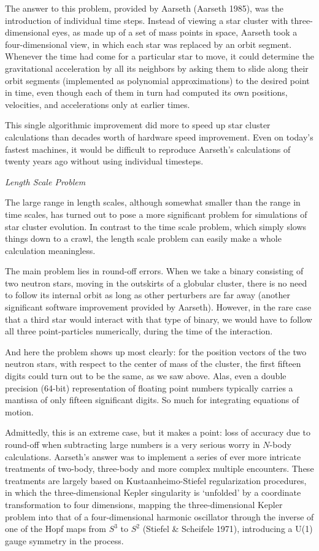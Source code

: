The answer to this problem, provided by Aarseth (\cf Aarseth 1985),
was the introduction of individual time steps.  Instead of viewing a
star cluster with three-dimensional eyes, as made up of a set of mass
points in space, Aarseth took a four-dimensional view, in which each
star was replaced by an orbit segment.  Whenever the time had come for
a particular star to move, it could determine the gravitational
acceleration by all its neighbors by asking them to slide along their
orbit segments (implemented as polynomial approximations) to the
desired point in time, even though each of them in turn had computed
its own positions, velocities, and accelerations only at earlier times.

This single algorithmic improvement did more to speed up star cluster
calculations than decades worth of hardware speed improvement.  Even
on today's fastest machines, it would be difficult to reproduce
Aarseth's calculations of twenty years ago without using individual
timesteps.

\bigskip
\noindent
{\it Length Scale Problem}
\medskip

The large range in length scales, although somewhat smaller than the
range in time scales, has turned out to pose a more significant
problem for simulations of star cluster evolution.  In contrast to the
time scale problem, which simply slows things down to a crawl, the
length scale problem can easily make a whole calculation meaningless.

The main problem lies in round-off errors.  When we take a binary
consisting of two neutron stars, moving in the outskirts of a globular
cluster, there is no need to follow its internal orbit as long as
other perturbers are far away (another significant software
improvement provided by Aarseth).  However, in the rare case that a
third star would interact with that type of binary, we would have to
follow all three point-particles numerically, during the time of the
interaction.

And here the problem shows up most clearly: for the position vectors
of the two neutron stars, with respect to the center of mass of the
cluster, the first fifteen digits could turn out to be the same, as we
saw above.  Alas, even a double precision (64-bit) representation of
floating point numbers typically carries a mantissa of only fifteen
significant digits.  So much for integrating equations of motion.

Admittedly, this is an extreme case, but it makes a point: loss of
accuracy due to round-off when subtracting large numbers is a very
serious worry in $N$-body calculations.  Aarseth's answer was to
implement a series of ever more intricate treatments of two-body,
three-body and more complex multiple encounters.  These treatments are
largely based on Kustaanheimo-Stiefel regularization procedures, in
which the three-dimensional Kepler singularity is `unfolded' by a
coordinate transformation to four dimensions, mapping the
three-dimensional Kepler problem into that of a four-dimensional
harmonic oscillator through the inverse of one of the Hopf maps from
$S^3$ to $S^2$ (\cf Stiefel \& Scheifele 1971), introducing a U(1)
gauge symmetry in the process.

